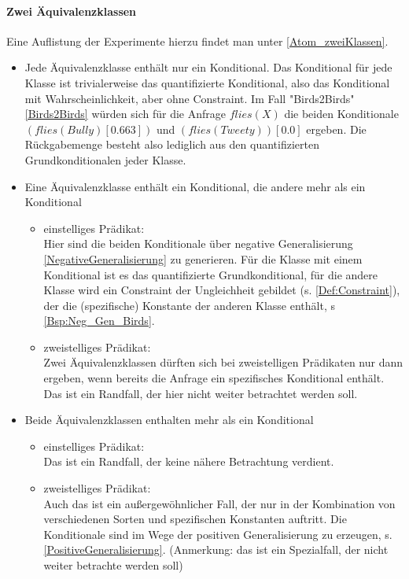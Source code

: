 \documentclass[a4paper, 11pt]{book}
\begin{document}
\paragraph{ Zwei Äquivalenzklassen}
Eine Auflistung der  Experimente hierzu findet man unter \ref{Atom_zweiKlassen}.
\begin{itemize}
\item Jede Äquivalenzklasse enthält nur ein Konditional. Das Konditional für jede Klasse ist trivialerweise das quantifizierte Konditional, also das Konditional mit Wahrscheinlichkeit, aber ohne Constraint. Im Fall "{}Birds2Birds"{} \ref{Birds2Birds} würden sich für die Anfrage $flies(X)$ die beiden Konditionale $ (flies(Bully)[0.663]) $ und $ (flies(Tweety))[0.0] $ ergeben. Die Rückgabemenge besteht also lediglich aus den quantifizierten  Grundkonditionalen jeder Klasse.
\item Eine Äquivalenzklasse enthält ein Konditional, die andere mehr als ein Konditional
\begin{itemize}
	\item einstelliges Prädikat:\\
	Hier sind die beiden Konditionale über negative Generalisierung \ref{NegativeGeneralisierung} zu generieren. Für die Klasse mit einem Konditional ist es das quantifizierte Grundkonditional, für die andere Klasse wird ein Constraint der Ungleichheit gebildet (s. \ref{Def:Constraint}), der die (spezifische) Konstante der anderen Klasse enthält, s \ref{Bsp:Neg_Gen_Birds}. 
	\item zweistelliges Prädikat:\\
	Zwei Äquivalenzklassen dürften sich bei zweistelligen Prädikaten nur dann ergeben, wenn bereits die Anfrage ein spezifisches Konditional enthält. Das ist ein Randfall, der hier nicht weiter betrachtet werden soll. 
\end{itemize}
\item Beide Äquivalenzklassen enthalten mehr als ein Konditional
\begin{itemize}
	\item {einstelliges Prädikat:}\\
	Das ist ein Randfall, der keine nähere Betrachtung verdient.
	\item zweistelliges Prädikat:\\
	Auch das ist ein außergewöhnlicher Fall, der nur in der Kombination von verschiedenen Sorten und spezifischen Konstanten auftritt. Die Konditionale sind im Wege der positiven Generalisierung zu erzeugen, s. \ref{PositiveGeneralisierung}.
	(Anmerkung: das ist ein Spezialfall, der nicht weiter betrachte werden soll)
\end{itemize}
\end{itemize}
\end{document}

